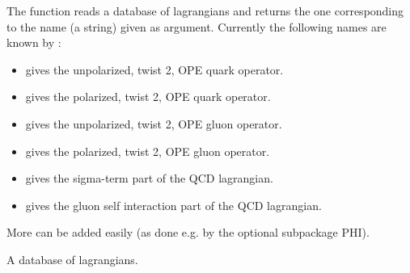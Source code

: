 The function  reads a database of lagrangians and returns the one corresponding to the name (a string) given as argument. Currently the following names are known by :
\begin{itemize}
 \item {} gives the unpolarized, twist 2, OPE quark operator.
 \item {} gives the polarized, twist 2, OPE quark operator.
 \item {} gives the unpolarized, twist 2, OPE gluon operator.
 \item {} gives the polarized, twist 2, OPE gluon operator.
 \item {} gives the sigma-term part of the QCD lagrangian.
 \item {} gives the gluon self interaction part of the QCD lagrangian.
\end{itemize}
More can be added easily (as done e.g. by the optional subpackage PHI).

 {A database of lagrangians.}

